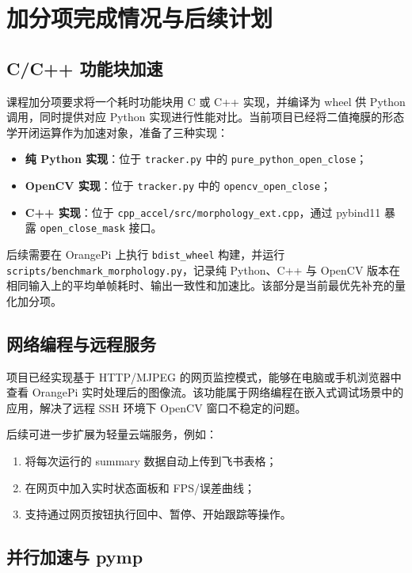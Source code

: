 \chapter{加分项完成情况与后续计划}

\section{C/C++ 功能块加速}

课程加分项要求将一个耗时功能块用 C 或 C++ 实现，并编译为 wheel 供 Python 调用，同时提供对应 Python 实现进行性能对比。当前项目已经将二值掩膜的形态学开闭运算作为加速对象，准备了三种实现：

\begin{itemize}
  \item \textbf{纯 Python 实现}：位于 \texttt{tracker.py} 中的 \texttt{pure\_python\_open\_close}；
  \item \textbf{OpenCV 实现}：位于 \texttt{tracker.py} 中的 \texttt{opencv\_open\_close}；
  \item \textbf{C++ 实现}：位于 \texttt{cpp\_accel/src/morphology\_ext.cpp}，通过 pybind11 暴露 \texttt{open\_close\_mask} 接口。
\end{itemize}

后续需要在 OrangePi 上执行 \texttt{bdist\_wheel} 构建，并运行 \texttt{scripts/benchmark\_morphology.py}，记录纯 Python、C++ 与 OpenCV 版本在相同输入上的平均单帧耗时、输出一致性和加速比。该部分是当前最优先补充的量化加分项。

\section{网络编程与远程服务}

项目已经实现基于 HTTP/MJPEG 的网页监控模式，能够在电脑或手机浏览器中查看 OrangePi 实时处理后的图像流。该功能属于网络编程在嵌入式调试场景中的应用，解决了远程 SSH 环境下 OpenCV 窗口不稳定的问题。

后续可进一步扩展为轻量云端服务，例如：

\begin{enumerate}
  \item 将每次运行的 summary 数据自动上传到飞书表格；
  \item 在网页中加入实时状态面板和 FPS/误差曲线；
  \item 支持通过网页按钮执行回中、暂停、开始跟踪等操作。
\end{enumerate}

\section{并行加速与 pymp}

